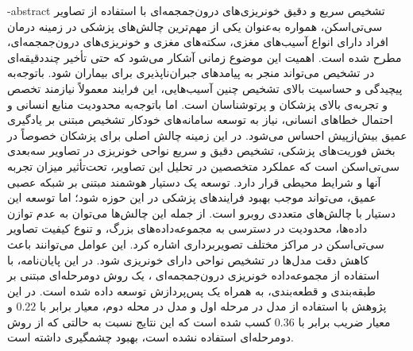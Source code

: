 \department{}



\fa-abstract{
تشخیص سریع و دقیق خونریزی‌های درون‌جمجمه‌ای با استفاده از تصاویر سی‌تی‌اسکن، همواره به‌عنوان یکی از مهم‌ترین چالش‌های پزشکی در زمینه درمان افراد دارای انواع آسیب‌های مغزی، سکته‌های مغزی و خونریزی‌های درون‌جمجمه‌ای، مطرح شده است. اهمیت این موضوع زمانی آشکار می‌شود که حتی تأخیر چنددقیقه‌ای در تشخیص می‌تواند منجر به پیامدهای جبران‌ناپذیری برای بیماران شود.
باتوجه‌به پیچیدگی و حساسیت بالای تشخیص چنین آسیب‌هایی، این فرایند معمولاً نیازمند تخصص و تجربه‌ی بالای پزشکان و پرتوشناسان است. اما باتوجه‌به محدودیت منابع انسانی و احتمال خطاهای انسانی، نیاز به توسعه سامانه‌های خودکار تشخیص مبتنی بر یادگیری عمیق بیش‌ازپیش احساس می‌شود.
در این زمینه چالش اصلی برای پزشکان خصوصاً در بخش فوریت‌های پزشکی، تشخیص دقیق و سریع نواحی خونریزی در تصاویر سه‌بعدی سی‌تی‌اسکن است که عملکرد متخصصین در تحلیل این تصاویر، تحت‌تأثیر میزان تجربه آنها و شرایط محیطی قرار دارد.
توسعه یک دستیار هوشمند مبتنی بر شبکه عصبی عمیق، می‌تواند موجب بهبود فرایندهای پزشکی در این حوزه شود؛ اما توسعه این دستیار با چالش‌های متعددی روبرو است. از جمله این چالش‌ها می‌توان به عدم توازن داده‌ها، محدودیت در دسترسی به مجموعه‌داده‌های بزرگ، و تنوع کیفیت تصاویر سی‌تی‌اسکن در مراکز مختلف تصویربرداری اشاره کرد. این عوامل می‌توانند باعث کاهش دقت مدل‌ها در تشخیص نواحی دارای خونریزی شود. در این پایان‌نامه، با استفاده از مجموعه‌داده خونریزی درون‌جمجمه‌ای 
،
 یک روش دومرحله‌ای مبتنی بر طبقه‌بندی و قطعه‌بندی، به همراه یک پس‌پردازش توسعه داده شده است. در این پژوهش با استفاده از مدل
در مرحله اول و مدل  
در محله دوم، معیار
برابر با 
$0.22$
و معیار ضریب 
برابر با 
$0.36$
کسب شده است که این نتایج نسبت به حالتی که از روش دومرحله‌ای استفاده نشده است،‌ بهبود چشمگیری داشته است.
 }


